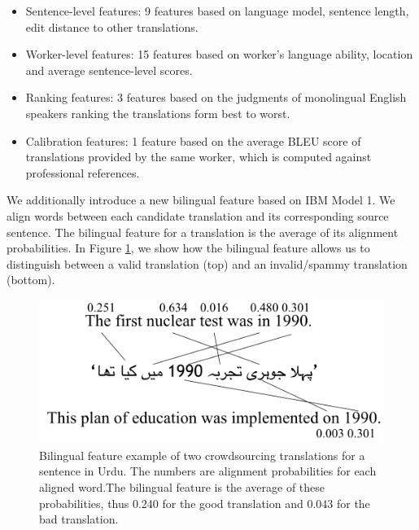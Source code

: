 \documentclass[11pt,letterpaper]{article}
\begin{document}
\begin{itemize}
\item  Sentence-level features: 9 features based on language model, sentence length, edit distance to other translations. 
\item Worker-level features: 15 features based on worker's language ability, location and average sentence-level scores.
\item Ranking features: 3 features based on the judgments of monolingual English speakers ranking the translations form best to worst.
\item Calibration features: 1 feature based on the average BLEU score of translations provided by the same worker, which is computed against professional references.
\end{itemize}


We additionally introduce a new bilingual feature based on IBM Model 1. We align words between each candidate translation and its corresponding source sentence. The bilingual feature for a translation is the average of its alignment probabilities. In Figure \ref{biexample1}, we show how the bilingual feature allows us to distinguish between a valid translation (top) and an invalid/spammy translation (bottom).

\begin{figure}[h!]
  \centering
  \includegraphics[width=\linewidth]{bilingualexample/example.png}
  \caption{Bilingual feature example of two crowdsourcing translations for a sentence in Urdu. The numbers are alignment probabilities for each aligned word.The bilingual feature is the average of these probabilities, thus 0.240 for the good translation and 0.043 for the bad translation.
}
    \label{biexample1}
\end{figure}

\end{document}
